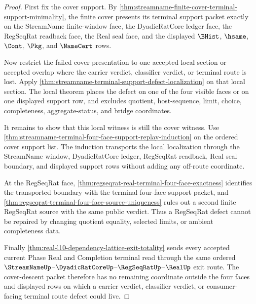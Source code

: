\begin{proof}
First fix the cover support. By
\autoref{thm:streamname-finite-cover-terminal-support-minimality}, the
finite cover presents its terminal support packet exactly on the StreamName
finite-window face, the DyadicRatCore ledger face, the RegSeqRat readback
face, the Real seal face, and the displayed $\BHist$, $\hsame$, $\Cont$,
$\Pkg$, and $\NameCert$ rows.

Now restrict the failed cover presentation to one accepted local section or
accepted overlap where the carrier verdict, classifier verdict, or terminal
route is lost. Apply
\autoref{thm:streamname-terminal-support-defect-localization} on that local
section. The local theorem places the defect on one of the four visible faces
or on one displayed support row, and excludes quotient, host-sequence, limit,
choice, completeness, aggregate-status, and bridge coordinates.

It remains to show that this local witness is still the cover witness. Use
\autoref{thm:streamname-terminal-four-face-support-replay-induction} on the
ordered cover support list. The induction transports the local localization
through the StreamName window, DyadicRatCore ledger, RegSeqRat readback, Real
seal boundary, and displayed support rows without adding any off-route
coordinate.

At the RegSeqRat face,
\autoref{thm:regseqrat-real-terminal-four-face-exactness} identifies the
transported boundary with the terminal four-face support packet, and
\autoref{thm:regseqrat-terminal-four-face-source-uniqueness} rules out a
second finite RegSeqRat source with the same public verdict. Thus a RegSeqRat
defect cannot be repaired by changing quotient equality, selected limits, or
ambient completeness data.

Finally
\autoref{thm:real-l10-dependency-lattice-exit-totality} sends every accepted
current Phase Real and Completion terminal read through the same ordered
$\StreamNameUp$--$\DyadicRatCoreUp$--$\RegSeqRatUp$--$\RealUp$ exit route.
The cover-descent packet therefore has no remaining coordinate outside the
four faces and displayed rows on which a carrier verdict, classifier verdict,
or consumer-facing terminal route defect could live.
\end{proof}

